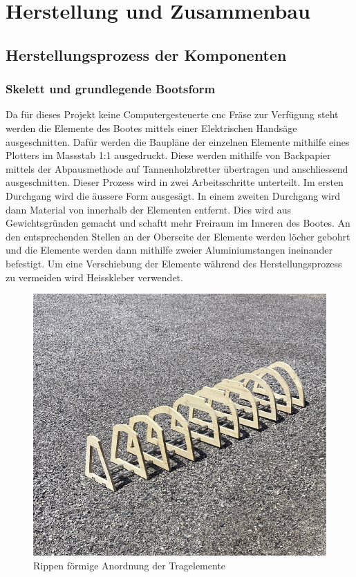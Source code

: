 

\chapter{Herstellung und Zusammenbau}
\label{chap:herstllung}

\section{Herstellungsprozess der Komponenten}
\subsection{Skelett und grundlegende Bootsform}
Da für dieses Projekt keine Computergesteuerte \ac{cnc} Fräse zur Verfügung steht werden die Elemente des Bootes mittels einer Elektrischen Handsäge ausgeschnitten. Dafür werden die Baupläne der einzelnen Elemente mithilfe eines Plotters im Massstab 1:1 ausgedruckt. Diese werden mithilfe von Backpapier mittels der Abpausmethode auf Tannenholzbretter übertragen und anschliessend ausgeschnitten. Dieser Prozess wird in zwei Arbeitsschritte unterteilt. Im ersten Durchgang wird die äussere Form ausgesägt. In einem zweiten Durchgang wird dann Material von innerhalb der Elementen entfernt. Dies wird aus Gewichtsgründen gemacht und schaftt mehr Freiraum im Inneren des Bootes.
An den entsprechenden Stellen an der Oberseite der Elemente werden löcher gebohrt und die Elemente werden dann mithilfe zweier Aluminiumstangen ineinander befestigt. Um eine Verschiebung der Elemente während des Herstellungsprozess zu vermeiden wird Heisskleber verwendet. 
\begin{figure}[H]
    \centering
    \includegraphics[width=1\linewidth]{rippe1.png}
    \caption{Rippen förmige Anordnung der Tragelemente}
    \label{fig:enter-label}
\end{figure}

